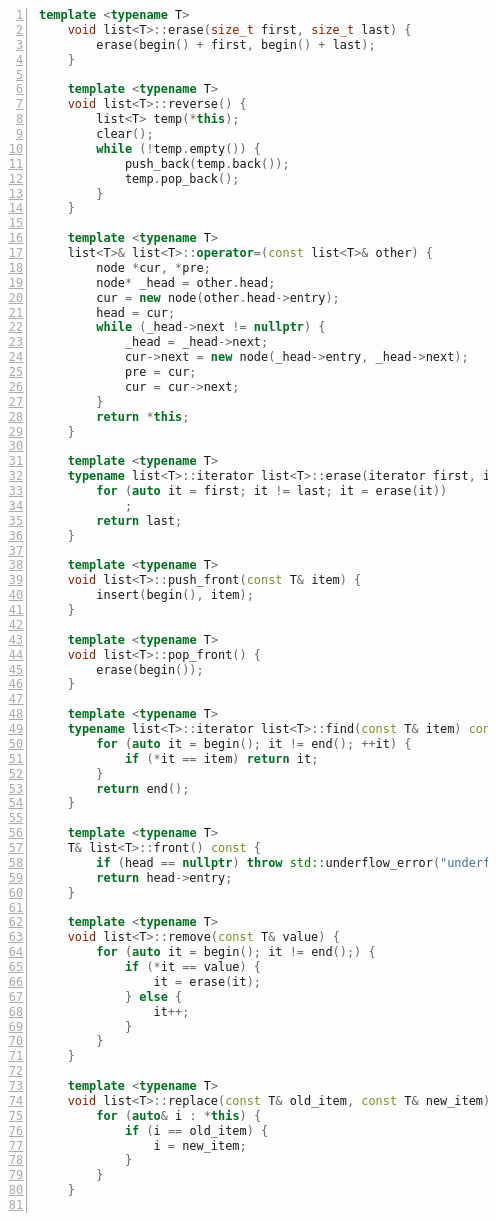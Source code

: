 \documentclass{article}
\begin{document}
\begin{lstlisting}[xleftmargin = 2em,xrightmargin = 2em, aboveskip = 0.5em, numbers = left, language = C++]
    template <typename T>
    void list<T>::erase(size_t first, size_t last) {
        erase(begin() + first, begin() + last);
    }

    template <typename T>
    void list<T>::reverse() {
        list<T> temp(*this);
        clear();
        while (!temp.empty()) {
            push_back(temp.back());
            temp.pop_back();
        }
    }

    template <typename T>
    list<T>& list<T>::operator=(const list<T>& other) {
        node *cur, *pre;
        node* _head = other.head;
        cur = new node(other.head->entry);
        head = cur;
        while (_head->next != nullptr) {
            _head = _head->next;
            cur->next = new node(_head->entry, _head->next);
            pre = cur;
            cur = cur->next;
        }
        return *this;
    }

    template <typename T>
    typename list<T>::iterator list<T>::erase(iterator first, iterator last) {
        for (auto it = first; it != last; it = erase(it))
            ;
        return last;
    }

    template <typename T>
    void list<T>::push_front(const T& item) {
        insert(begin(), item);
    }

    template <typename T>
    void list<T>::pop_front() {
        erase(begin());
    }

    template <typename T>
    typename list<T>::iterator list<T>::find(const T& item) const {
        for (auto it = begin(); it != end(); ++it) {
            if (*it == item) return it;
        }
        return end();
    }

    template <typename T>
    T& list<T>::front() const {
        if (head == nullptr) throw std::underflow_error("underflow");
        return head->entry;
    }

    template <typename T>
    void list<T>::remove(const T& value) {
        for (auto it = begin(); it != end();) {
            if (*it == value) {
                it = erase(it);
            } else {
                it++;
            }
        }
    }

    template <typename T>
    void list<T>::replace(const T& old_item, const T& new_item) {
        for (auto& i : *this) {
            if (i == old_item) {
                i = new_item;
            }
        }
    }


\end{lstlisting}
\end{document}
